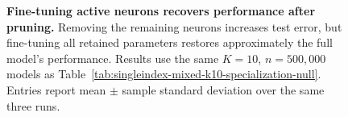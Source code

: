 \documentclass{article}
\newcounter{model}[section]
\begin{document}
\begin{figure}
\begin{table}[H]
    \centering
    \small
    \renewcommand{\arraystretch}{1.15}
    \setlength{\tabcolsep}{5pt}
    \caption{\textbf{Fine-tuning active neurons recovers performance after pruning.}
    Removing the remaining neurons increases test error, but fine-tuning
    all retained parameters restores approximately the full model's performance.
    Results use the same \(K=10\), \(n=500{,}000\) models as
    Table~\ref{tab:singleindex-mixed-k10-specialization-null}. Entries report
    mean \(\pm\) sample standard deviation over the same three runs.}
    \label{tab:importance-pruning-performance}
\end{table}


\end{figure}
\end{document}
